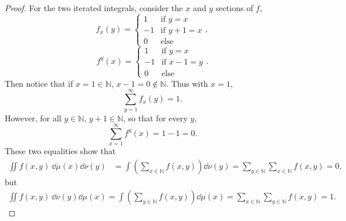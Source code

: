 \documentclass[11pt]{article}
\begin{document}
\begin{proof}
  For the two iterated integrals, consider the \( x \) and \( y \) sections of \( f \),
  \begin{equation}
  \label{eq:14}
  f_x(y) = \begin{cases}
    1 &\text{if } y = x\\
    -1 &\text{if } y + 1 = x \\
    0 &\text{else}
  \end{cases},
  \end{equation}
  \begin{equation}
  \label{eq:13}
  f^y(x) = \begin{cases}
    1 &\text{if } y = x \\
    -1 &\text{if } x - 1 = y \\
    0 &\text{else}
  \end{cases}.
\end{equation}
Then notice that if \( x = 1 \in \mathbb{N} \), \( x - 1 = 0 \not\in \mathbb{N} \).
Thus with \( x = 1 \),
\begin{equation}
\label{eq:17}
\sum\limits_{y=1}^{\infty} f_x(y) = 1.
\end{equation}
However, for all \( y \in \mathbb{N} \), \( y + 1 \in \mathbb{N} \), so that for every \( y \),
\begin{equation}
\label{eq:18}
\sum\limits_{x=1}^{\infty} f^y(x) = 1 - 1 = 0.
\end{equation}
These two equalities show that
\begin{equation}
\label{eq:19}
\begin{aligned}
  \iint f(x,y) \ \dd\mu(x)\dd\nu(y) &= \int \left( \sum\limits_{x \in \mathbb{N}} f(x,y) \right) \dd\nu(y) = \sum\limits_{y \in \mathbb{N}} \sum\limits_{x \in \mathbb{N}} f(x,y) = 0,
\end{aligned}
\end{equation}
but
\begin{equation}
\label{eq:20}
\begin{aligned}
  \iint f(x,y) \ \dd\nu(y)\dd\mu(x) = \int \left( \sum\limits_{y \in \mathbb{N}} f(x,y) \right) \dd\mu(x) = \sum\limits_{x \in \mathbb{N}} \sum\limits_{y \in \mathbb{N}} f(x,y) = 1.
\end{aligned}
\end{equation}
\end{proof}
\end{document}

